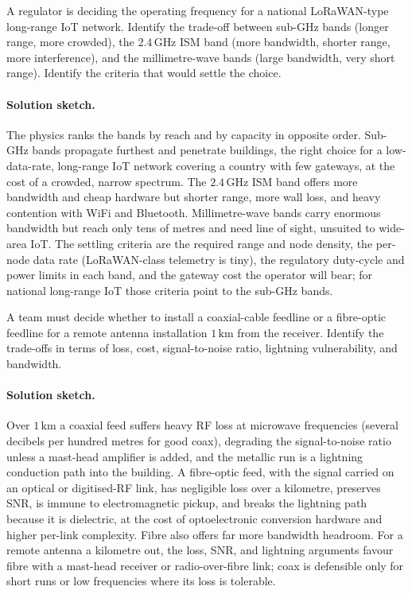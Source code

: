 \begin{exercise}
A regulator is deciding the operating frequency for a national
LoRaWAN-type long-range IoT network. Identify the trade-off between
sub-GHz bands (longer range, more crowded), the $2.4\,\si{\giga\hertz}$
ISM band (more bandwidth, shorter range, more interference), and the
millimetre-wave bands (large bandwidth, very short range). Identify
the criteria that would settle the choice.
\paragraph{Solution sketch.} The physics ranks the bands by reach and by
capacity in opposite order. Sub-GHz bands propagate furthest and
penetrate buildings, the right choice for a low-data-rate, long-range
IoT network covering a country with few gateways, at the cost of a
crowded, narrow spectrum. The $2.4\,\si{\giga\hertz}$ ISM band offers
more bandwidth and cheap hardware but shorter range, more wall loss, and
heavy contention with WiFi and Bluetooth. Millimetre-wave bands carry
enormous bandwidth but reach only tens of metres and need line of sight,
unsuited to wide-area IoT. The settling criteria are the required range
and node density, the per-node data rate (LoRaWAN-class telemetry is
tiny), the regulatory duty-cycle and power limits in each band, and the
gateway cost the operator will bear; for national long-range IoT those
criteria point to the sub-GHz bands.
\end{exercise}

\begin{exercise}
A team must decide whether to install a coaxial-cable feedline or a
fibre-optic feedline for a remote antenna installation $1\,\si{\kilo
\meter}$ from the receiver. Identify the trade-offs in terms of loss,
cost, signal-to-noise ratio, lightning vulnerability, and bandwidth.
\paragraph{Solution sketch.} Over $1\,\si{\kilo\meter}$ a coaxial feed
suffers heavy RF loss at microwave frequencies (several decibels per
hundred metres for good coax), degrading the signal-to-noise ratio
unless a mast-head amplifier is added, and the metallic run is a
lightning conduction path into the building. A fibre-optic feed, with
the signal carried on an optical or digitised-RF link, has negligible
loss over a kilometre, preserves SNR, is immune to electromagnetic
pickup, and breaks the lightning path because it is dielectric, at the
cost of optoelectronic conversion hardware and higher per-link
complexity. Fibre also offers far more bandwidth headroom. For a remote
antenna a kilometre out, the loss, SNR, and lightning arguments favour
fibre with a mast-head receiver or radio-over-fibre link; coax is
defensible only for short runs or low frequencies where its loss is
tolerable.
\end{exercise}
